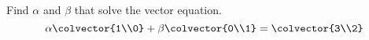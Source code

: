 Find $\alpha$ and $\beta$ that solve the vector equation.
%
\begin{equation*}
\alpha\colvector{1\\0}+
\beta\colvector{0\\1}
=
\colvector{3\\2}
\end{equation*}
%